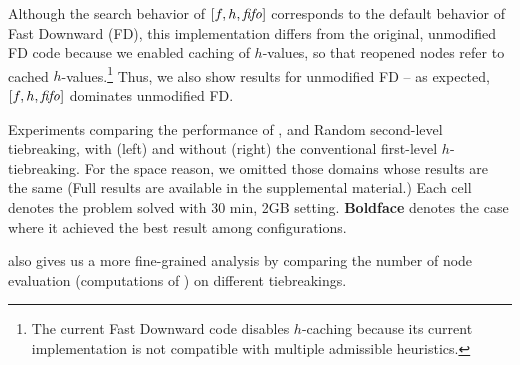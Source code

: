 Although the search behavior of $[f,h,\mbox{\textit{fifo}}]$ corresponds to the default behavior of Fast Downward (FD), this implementation differs 
from the original, unmodified FD code because we enabled caching of $h$-values, so that reopened nodes refer to cached $h$-values.\footnote{The current Fast Downward code disables $h$-caching because its current implementation is not compatible with multiple admissible heuristics.}
Thus, we also show results for unmodified FD -- as expected, $[f,h,\mbox{\textit{fifo}}]$ dominates unmodified FD.

\begin{table}[tb]
 \centering {}
 
 
 \caption{Experiments comparing the performance of \fifo, \lifo and Random
 second-level tiebreaking, with (left) and without (right) the
 conventional first-level $h$-tiebreaking.  For the space reason, we
 omitted those domains whose results are the same (Full results are
 available in the supplemental material.) Each cell denotes the problem
 solved with 30 min, 2GB setting. \textbf{Boldface} denotes the case
 where it achieved the best result among configurations.}
 \label{single-coverage}
\end{table}

 also gives us a
more fine-grained analysis by comparing the number of node evaluation
(computations of \lmcut) on different tiebreakings.

